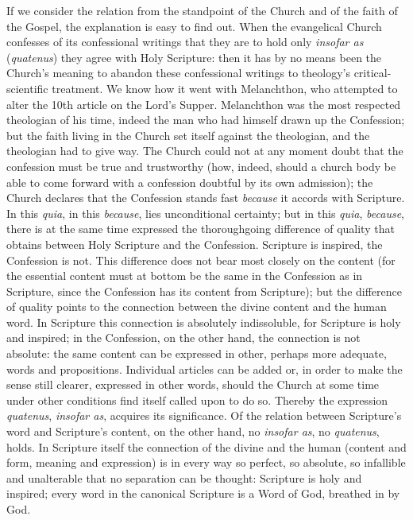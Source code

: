 \documentclass[12pt,a4paper]{book}
\begin{document}
If we consider the relation from the standpoint of the Church and of the faith of
the Gospel, the explanation is easy to find out. When the evangelical Church
confesses of its confessional writings that they are to hold only \emph{insofar
as} (\textit{quatenus}) they agree with Holy Scripture: then it has by no means
been the Church's meaning to abandon these confessional writings to theology's
critical-scientific treatment. We know how it went with Melanchthon, who
attempted to alter the 10th article on the Lord's Supper. Melanchthon was the
most respected theologian of his time, indeed the man who had himself drawn up
the Confession; but the faith living in the Church set itself against the
theologian, and the theologian had to give way. The Church could not at any moment
doubt that the confession must be true and trustworthy (how, indeed, should a
church body be able to come forward with a confession doubtful by its own
admission); the Church declares that the Confession stands fast \emph{because} it
accords with Scripture. In this \textit{quia}, in this \emph{because}, lies
unconditional certainty; but in this \textit{quia}, \emph{because}, there is at
the same time expressed the thoroughgoing difference of quality that obtains
between Holy Scripture and the Confession. Scripture is inspired, the Confession
is not. This difference does not bear most closely on the content
(for the essential content must at bottom be the same in the Confession as in
Scripture, since the Confession has its content from Scripture); but the
difference of quality points to the connection between the divine content and the
human word. In Scripture this connection is absolutely indissoluble, for Scripture
is holy and inspired; in the Confession, on the other hand, the connection is not
absolute: the same content can be expressed in other, perhaps more adequate, words
and propositions. Individual articles can be added or, in order to make the sense
still clearer, expressed in other words, should the Church at some time under other
conditions find itself called upon to do so. Thereby the expression
\textit{quatenus}, \emph{insofar as}, acquires its significance. Of the relation
between Scripture's word and Scripture's content, on the other hand, no
\emph{insofar as}, no \textit{quatenus}, holds. In Scripture itself the connection
of the divine and the human (content and form, meaning and expression) is in every
way so perfect, so absolute, so infallible and unalterable that no separation can
be thought: Scripture is holy and inspired; every word in the canonical Scripture
is a Word of God, breathed in by God.
\end{document}
